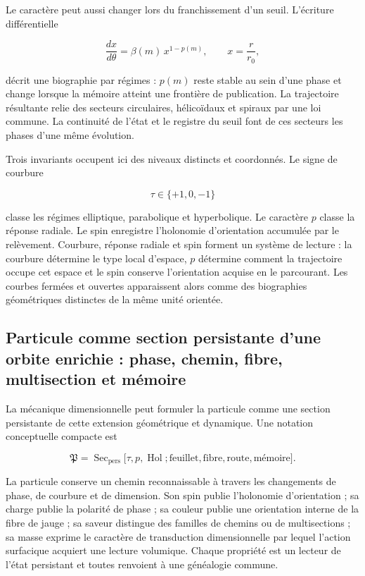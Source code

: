 Le caractère peut aussi changer lors du franchissement d'un seuil. L'écriture différentielle

\[
\frac{dx}{d\theta}
=
\beta(m)\,x^{1-p(m)},
\qquad x=\frac r{r_0},
\]

décrit une biographie par régimes : \(p(m)\) reste stable au sein d'une phase et change lorsque la mémoire atteint une frontière de publication. La trajectoire résultante relie des secteurs circulaires, hélicoïdaux et spiraux par une loi commune. La continuité de l'état et le registre du seuil font de ces secteurs les phases d'une même évolution.

Trois invariants occupent ici des niveaux distincts et coordonnés. Le signe de courbure

\[
\tau\in\{+1,0,-1\}
\]

classe les régimes elliptique, parabolique et hyperbolique. Le caractère \(p\) classe la réponse radiale. Le spin enregistre l'holonomie d'orientation accumulée par le relèvement. Courbure, réponse radiale et spin forment un système de lecture : la courbure détermine le type local d'espace, \(p\) détermine comment la trajectoire occupe cet espace et le spin conserve l'orientation acquise en le parcourant. Les courbes fermées et ouvertes apparaissent alors comme des biographies géométriques distinctes de la même unité orientée.

\subsection{Particule comme section persistante d'une orbite enrichie : phase, chemin, fibre, multisection et mémoire}

La mécanique dimensionnelle peut formuler la particule comme une section persistante de cette extension géométrique et dynamique. Une notation conceptuelle compacte est

\[
\mathfrak P
=
\operatorname{Sec}_{\mathrm{pers}}
\bigl[
\tau,p,\operatorname{Hol};
\text{feuillet},\text{fibre},\text{route},\text{mémoire}
\bigr].
\]

La particule conserve un chemin reconnaissable à travers les changements de phase, de courbure et de dimension. Son spin publie l'holonomie d'orientation ; sa charge publie la polarité de phase ; sa couleur publie une orientation interne de la fibre de jauge ; sa saveur distingue des familles de chemins ou de multisections ; sa masse exprime le caractère de transduction dimensionnelle par lequel l'action surfacique acquiert une lecture volumique. Chaque propriété est un lecteur de l'état persistant et toutes renvoient à une généalogie commune.

